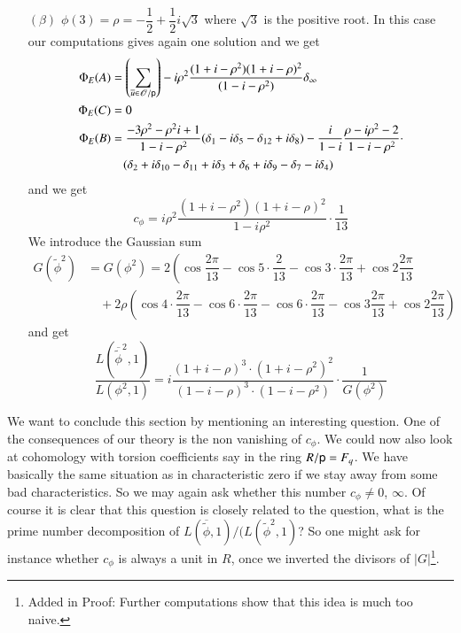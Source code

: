 \begin{itemize}
\begin{itemize}
\item[$(\beta)$] $\phi(3)=\rho=-\dfrac{1}{2}+\dfrac{1}{2}i\sqrt{3}$ where $\sqrt{3}$ is the positive root. In this case our computations gives again one solution and we get
\begin{align*}
\Phi_{E}(A) &=\left(\sum\limits_{\overline{u}\in \mathscr{O}/\mathsf{p}}\right)-i\rho^{2}\dfrac{(1+i-\rho^{2})(1+i-\rho)^{2}}{(1-i-\rho^{2})}\delta_{\infty}\\
\Phi_{E}(C) &=0\\
\Phi_{E}(B) &= \dfrac{-3\rho^{2}-\rho^{2}i+1}{1-i-\rho^{2}}(\delta_{1}-i\delta_{5}-\delta_{12}+i\delta_{8})-\dfrac{i}{1-i}\dfrac{\rho-i\rho^{2}-2}{1-i-\rho^{2}}\cdot\\
&\quad (\delta_{2}+i\delta_{10}-\delta_{11}+i\delta_{3}+\delta_{6}+i\delta_{9}-\delta_{7}-i\delta_{4})
\end{align*}\pageoriginale
and we get
$$
c_{\phi}=i\rho^{2}\dfrac{(1+i-\rho^{2})(1+i-\rho)^{2}}{1-i\rho^{2}}\cdot \dfrac{1}{13}
$$
We introduce the Gaussian sum
\begin{align*}
G(\widetilde{\phi}^{2})&= G(\phi^{2})=2\left(\cos\dfrac{2\pi}{13}-\cos 5\cdot \dfrac{2}{13}-\cos 3\cdot \dfrac{2\pi}{13}+\cos 2\dfrac{2\pi}{13}\right.\\
&\quad +2\rho\left(\cos 4\cdot \dfrac{2\pi}{13}-\cos 6\cdot \dfrac{2\pi}{13}-\cos 6\cdot \dfrac{2\pi}{13}-\cos 3\dfrac{2\pi}{13}+\cos 2\dfrac{2\pi}{13}\right)
\end{align*}
and get
$$
\dfrac{L(\overline{\widetilde{\phi}}^{2},1)}{L(\phi^{2},1)}=i\dfrac{(1+i-\rho)^{3}\cdot (1+i-\rho^{2})^{2}}{(1-i-\rho)^{3}\cdot (1-i-\rho^{2})}\cdot \dfrac{1}{G(\phi^{2})}
$$
\end{itemize}
\end{itemize}

We want to conclude this section by mentioning an interesting question. One of the consequences of our theory is the non vanishing of $c_{\phi}$. We could now also look at cohomology with torsion coefficients say in the ring $R/\mathsf{p}=F_{q}$. We have basically the same situation as in characteristic zero if we stay away from some bad characteristics. So we may again ask whether this number $c_{\phi}\neq 0$, $\infty$. Of course it is clear that this question is closely related to the question, what is the prime number decomposition of $L(\overline{\widetilde{\phi}},1)/(L(\widetilde{\phi}^{2},1)$? So one might ask for instance whether $c_{\phi}$ is always a unit in $R$, once we inverted the divisors of $|G|$\footnote[2]{Added in Proof: Further computations show that this idea is much too naive.}.

